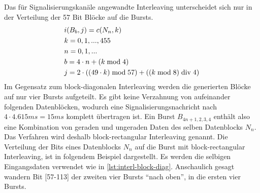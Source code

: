 Das für Signalisierungskanäle angewandte Interleaving  unterscheidet sich nur in der Verteilung der 57 Bit Blöcke auf die Bursts.
\begin{align}
\begin{split}
& i(B_b,j) = c(N_n,k) \\
& k = 0,1,...,455 \\
& n = 0,1,... \\
& b = 4 \cdot n + \left(k \bmod 4\right) \\
& j = 2 \cdot \left(\left( 49 \cdot k \right) \bmod 57 \right) + \left(\left( k \bmod 8 \right) \bdiv 4 \right)
\end{split}
\end{align}
Im Gegensatz zum block-diagonalen Interleaving werden die generierten Blöcke auf nur vier Bursts aufgeteilt. Es gibt keine Verzahnung von aufeinander folgenden Datenblöcken, wodurch eine Signalisierungsnachricht nach $4 \cdot 4.615 ms = 15 ms$ komplett übertragen ist. Ein Burst $B_{4n + 1,2,3,4}$ enthält also eine Kombination von geraden und ungeraden Daten des selben Datenblocks $N_n$. Das Verfahren wird deshalb block-rectangular Interleaving genannt. Die Verteilung der Bits eines Datenblocks $N_n$ auf die Burst mit block-rectangular Interleaving, ist in folgendem Beispiel dargestellt. Es werden die selbigen Eingangsdaten verwendet wie in \autoref{lst:interl-block-diag}. Anschaulich gesagt wandern Bit [57-113] der zweiten vier Bursts "`nach oben"', in die ersten vier Bursts.\\


